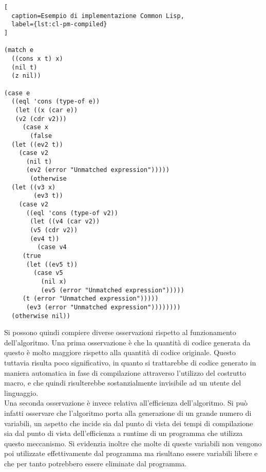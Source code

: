 
\begin{lstlisting}[
  caption=Esempio di implementazione Common Lisp,
  label={lst:cl-pm-compiled}
]

(match e
  ((cons x t) x)
  (nil t)
  (z nil))

(case e
  ((eql 'cons (type-of e))
   (let ((x (car e))
   (v2 (cdr v2)))
     (case x
       (false
  (let ((ev2 t))
    (case v2
      (nil t)
      (ev2 (error "Unmatched expression")))))
       (otherwise
  (let ((v3 x)
        (ev3 t))
    (case v2
      ((eql 'cons (type-of v2))
       (let ((v4 (car v2))
       (v5 (cdr v2))
       (ev4 t))
         (case v4
     (true
      (let ((ev5 t))
        (case v5
          (nil x)
          (ev5 (error "Unmatched expression")))))
     (t (error "Unmatched expression")))))
      (ev3 (error "Unmatched expression"))))))))
  (otherwise nil))

\end{lstlisting}

Si possono quindi compiere diverse osservazioni rispetto al funzionamento
dell'algoritmo. Una prima osservazione è che la quantità di codice generata da
questo è molto maggiore rispetto alla quantità di codice originale. Questo
tuttavia risulta poco significativo, in quanto si trattarebbe di codice generato
in maniera automatica in fase di compilazione attraverso l'utilizzo del
costrutto macro, e che quindi risulterebbe sostanzialmente invisibile ad un
utente del linguaggio.\\

Una seconda osservazione è invece relativa all'efficienza dell'algoritmo. Si può
infatti osservare che l'algoritmo porta alla generazione di un grande numero di
variabili, un aspetto che incide sia dal punto di vista dei tempi di
compilazione sia dal punto di vista dell'efficienza a runtime di un programma
che utilizza questo meccanismo. Si evidenzia inoltre che molte di queste
variabili non vengono poi utilizzate effettivamente dal programma ma risultano
essere variabili libere e che per tanto potrebbero essere eliminate dal
programma.\\


